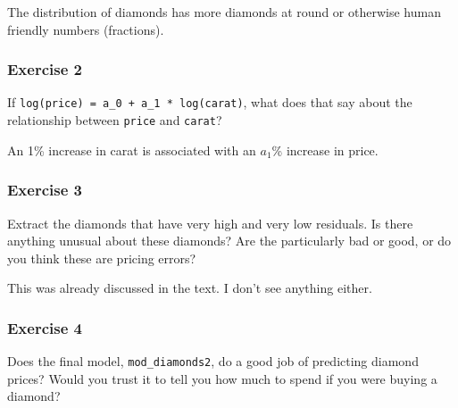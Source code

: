 \documentclass[]{book}
\newenvironment{Shaded}{\begin{snugshade}}{\end{snugshade}}
\newcommand{\CommentTok}[1]{\textcolor[rgb]{0.56,0.35,0.01}{\textit{#1}}}
\newcommand{\DataTypeTok}[1]{\textcolor[rgb]{0.13,0.29,0.53}{#1}}
\newcommand{\DecValTok}[1]{\textcolor[rgb]{0.00,0.00,0.81}{#1}}
\newcommand{\FloatTok}[1]{\textcolor[rgb]{0.00,0.00,0.81}{#1}}
\newcommand{\KeywordTok}[1]{\textcolor[rgb]{0.13,0.29,0.53}{\textbf{#1}}}
\newcommand{\NormalTok}[1]{#1}
\newcommand{\OperatorTok}[1]{\textcolor[rgb]{0.81,0.36,0.00}{\textbf{#1}}}
\newcommand{\StringTok}[1]{\textcolor[rgb]{0.31,0.60,0.02}{#1}}
\theoremstyle{definition}
\theoremstyle{definition}
\theoremstyle{definition}
\theoremstyle{remark}
\begin{document}
The distribution of diamonds has more diamonds at round or otherwise
human friendly numbers (fractions).

\hypertarget{exercise-2-59}{%
\subsubsection{Exercise 2}\label{exercise-2-59}}

If \texttt{log(price)\ =\ a\_0\ +\ a\_1\ *\ log(carat)}, what does that
say about the relationship between \texttt{price} and \texttt{carat}?

An 1\% increase in carat is associated with an \(a_1\)\% increase in
price.

\hypertarget{exercise-3-45}{%
\subsubsection{Exercise 3}\label{exercise-3-45}}

Extract the diamonds that have very high and very low residuals. Is
there anything unusual about these diamonds? Are the particularly bad or
good, or do you think these are pricing errors?

This was already discussed in the text. I don't see anything either.

\hypertarget{exercise-4-35}{%
\subsubsection{Exercise 4}\label{exercise-4-35}}

Does the final model, \texttt{mod\_diamonds2}, do a good job of
predicting diamond prices? Would you trust it to tell you how much to
spend if you were buying a diamond?

\begin{Shaded}
\end{Shaded}
\end{document}
